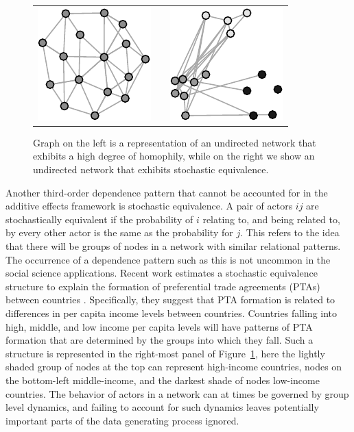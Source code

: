 \documentclass[12pt,pdflatex]{elsarticle}
\begin{document}
\begin{figure}[ht]
	\centering
	\caption{Graph on the left is a representation of an undirected network that exhibits a high degree of homophily, while on the right we show an undirected network that exhibits stochastic equivalence.}	
	\begin{tabular}{lcr}
	\includegraphics[width=.33\textwidth]{homophNet} & \hspace{2cm} &
	\includegraphics[width=.33\textwidth]{stochEquivNet}	
	\end{tabular}
	\label{fig:homphStochEquivNet}
\end{figure}

Another third-order dependence pattern that cannot be accounted for in the additive effects framework is stochastic equivalence. A pair of actors $ij$ are stochastically equivalent if the probability of $i$ relating to, and being related to, by every other actor is the same as the probability for $j$. This refers to the idea that there will be groups of nodes in a network with similar relational patterns. The occurrence of a dependence pattern such as this is not uncommon in the social science applications. Recent work estimates a stochastic equivalence structure to explain the formation of preferential trade agreements (PTAs) between countries \cite{manger:etal:2012}. Specifically, they suggest that PTA formation is related to differences in per capita income levels between countries. Countries falling into high, middle, and low income per capita levels will have patterns of PTA formation that are determined by the groups into which they fall. Such a structure is represented in the right-most panel of Figure~\ref{fig:homphStochEquivNet}, here the lightly shaded group of nodes at the top can represent high-income countries, nodes on the bottom-left middle-income, and the darkest shade of nodes low-income countries. The behavior of actors in a network can at times be governed by group level dynamics, and failing to account for such dynamics leaves potentially important parts of the data generating process ignored.
\end{document}
